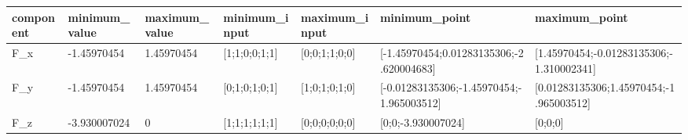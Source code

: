 \begin{tabular}{@{}lllllll@{}}
\toprule
component & minimum\_value & maximum\_value & minimum\_input & maximum\_input & minimum\_point & maximum\_point \\
\midrule
F\_x & -1.45970454 & 1.45970454 & [1;1;0;0;1;1] & [0;0;1;1;0;0] & [-1.45970454;0.01283135306;-2.620004683] & [1.45970454;-0.01283135306;-1.310002341] \\
F\_y & -1.45970454 & 1.45970454 & [0;1;0;1;0;1] & [1;0;1;0;1;0] & [-0.01283135306;-1.45970454;-1.965003512] & [0.01283135306;1.45970454;-1.965003512] \\
F\_z & -3.930007024 & 0 & [1;1;1;1;1;1] & [0;0;0;0;0;0] & [0;0;-3.930007024] & [0;0;0] \\
\bottomrule
\end{tabular}
